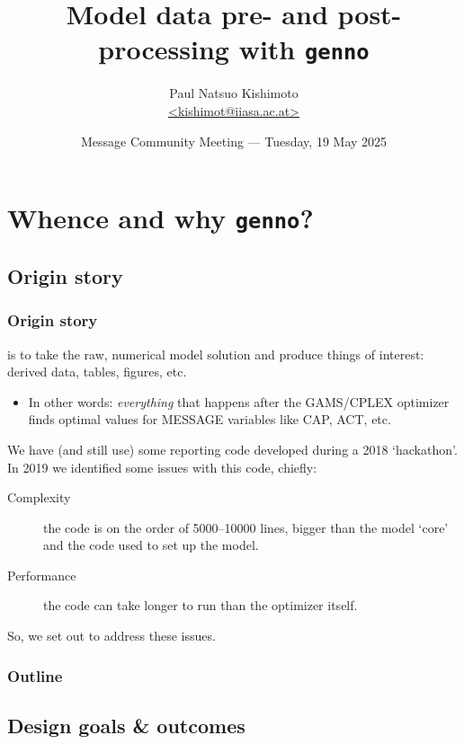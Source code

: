 \documentclass[12pt,aspectratio=169]{beamer}
\title{Model data pre- and post-processing with \texttt{genno}}
\date{
  \texorpdfstring{Message Community Meeting — Tuesday, 19 May 2025}%
  {2025-05-19}}
\author{\texorpdfstring{Paul Natsuo Kishimoto\\
  \href{mailto:kishimot@iiasa.ac.at}{\ttfamily \scriptsize <kishimot@iiasa.ac.at>}%
  }{Paul Natsuo Kishimoto <kishimot@iiasa.ac.at>}}
\begin{document}
\maketitle

\section{Whence and why \texttt{genno}?}

\subsection{Origin story}

\begin{frame}
\frametitle{Origin story}

 is to take the raw, numerical model solution
and produce things of interest: derived data, tables, figures, etc.
\begin{itemize}
  \item In other words: \emph{everything} that happens after the GAMS/CPLEX optimizer finds optimal values for MESSAGE variables like CAP, ACT, etc.
\end{itemize}

\medskip
We have (and still use) some reporting code developed during a 2018 ‘hackathon’.
In 2019 we identified some issues with this code, chiefly:

\begin{description}
  \item [Complexity] the code is on the order of 5000–10000 lines,
    bigger than the model ‘core’ and the code used to set up the model.
  \item [Performance] the code can take longer to run than the optimizer itself.
\end{description}

So, we set out to address these issues.
\end{frame}

\begin{frame}
\frametitle{Outline}

\tableofcontents

\end{frame}

\subsection{Design goals \& outcomes}
\end{document}
